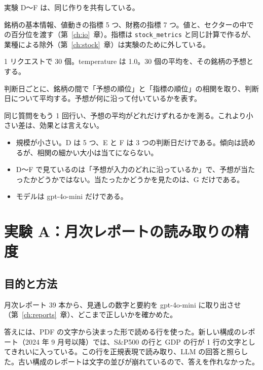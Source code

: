 \documentclass[xelatex,ja=standard,jafont=hiragino-pron,a4paper,10pt]{bxjsreport}
\newcommand{\SP}{S\&P500}
\newcommand{\code}[1]{\texttt{#1}}
\newcommand{\chapref}[1]{第~\ref{#1}~章}
\begin{document}
実験 D〜F は、同じ作りを共有している。

\begin{description}[leftmargin=2em,style=nextline,itemsep=0.3em]
\item[入力] 銘柄の基本情報、値動きの指標 5 つ、財務の指標 7 つ。値と、セクターの中での百分位を渡す（\chapref{ch:io}）。指標は \code{stock\_metrics} と同じ計算で作るが、業種による除外（\chapref{ch:stock}）は実験のために外している。
\item[回答] 1 リクエストで 30 個。temperature は 1.0。30 個の平均を、その銘柄の予想とする。
\item[見る量] 判断日ごとに、銘柄の間で「予想の順位」と「指標の順位」の相関を取り、判断日について平均する。予想が何に沿って付いているかを表す。
\item[雑音の目安] 同じ質問をもう 1 回行い、予想の平均がどれだけずれるかを測る。これより小さい差は、効果とは言えない。
\end{description}

\begin{notebox}[結果を読むときの注意]
\begin{itemize}
\item 規模が小さい。D は 5 つ、E と F は 3 つの判断日だけである。傾向は読めるが、相関の細かい大小は当てにならない。
\item D〜F で見ているのは「予想が入力のどれに沿っているか」で、予想が当たったかどうかではない。当たったかどうかを見たのは、G だけである。
\item モデルは gpt-4o-mini だけである。
\end{itemize}
\end{notebox}

\chapter{実験 A：月次レポートの読み取りの精度}\label{ch:expA}

\section{目的と方法}

月次レポート 39 本から、見通しの数字と要約を gpt-4o-mini に取り出させ（\chapref{ch:reports}）、どこまで正しいかを確かめた。

答えには、PDF の文字から決まった形で読める行を使った。新しい構成のレポート（2024 年 9 月号以降）では、\SP{} の行と GDP の行が 1 行の文字としてきれいに入っている。この行を正規表現で読み取り、LLM の回答と照らした。古い構成のレポートは文字の並びが崩れているので、答えを作れなかった。
\end{document}
